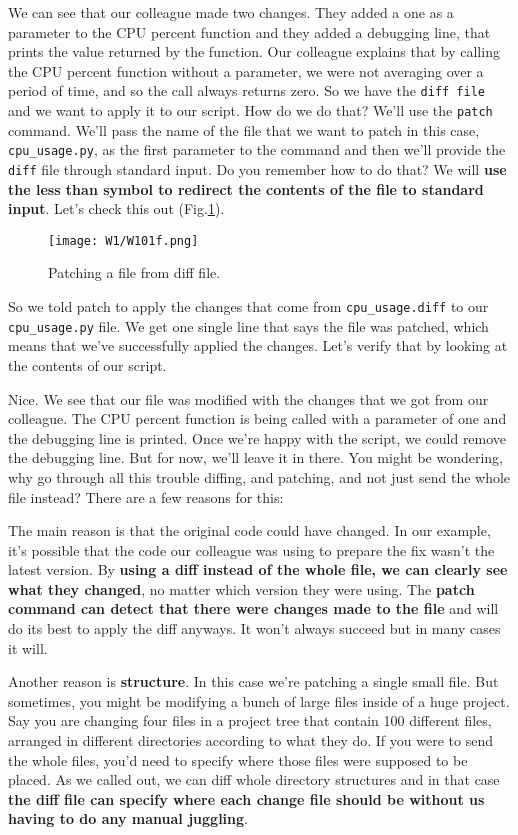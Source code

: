 	We can see that our colleague made two changes. They added a one as a parameter to the CPU percent function and they added a debugging line, that prints the value returned by the function. Our colleague explains that by calling the CPU percent function without a parameter, we were not averaging over a period of time, and so the call always returns zero. 
	So we have the \texttt{diff file} and we want to apply it to our script. How do we do that? We'll use the \texttt{patch} command. 
	We'll pass the name of the file that we want to patch in this case, \verb|cpu_usage.py|, as the first parameter to the command and then we'll provide the \texttt{diff} file through standard input. Do you remember how to do that? We will \textbf{use the less than symbol to redirect the contents of the file to standard input}. Let's check this out (Fig.\ref{W101f}).
	
	\begin{figure} 
		\caption{Patching a file from diff file.}
		\centering
		\texttt{[image: W1/W101f.png]}
		\label{W101f}
	\end{figure}

	So we told patch to apply the changes that come from \verb|cpu_usage.diff| to our \verb|cpu_usage.py| file. We get one single line that says the file was patched, which means that we've successfully applied the changes. Let's verify that by looking at the contents of our script.

	Nice. We see that our file was modified with the changes that we got from our colleague. The CPU percent function is being called with a parameter of one and the debugging line is printed. Once we're happy with the script, we could remove the debugging line. But for now, we'll leave it in there. You might be wondering, why go through all this trouble diffing, and patching, and not just send the whole file instead? 
	There are a few reasons for this: 
	
	The main reason is that the original code could have changed. In our example, it's possible that the code our colleague was using to prepare the fix wasn't the latest version. By \textbf{using a diff instead of the whole file, we can clearly see what they changed}, no matter which version they were using. The \textbf{patch command can detect that there were changes made to the file} and will do its best to apply the diff anyways. It won't always succeed but in many cases it will. 
	
	Another reason is \textbf{structure}. In this case we're patching a single small file. But sometimes, you might be modifying a bunch of large files inside of a huge project. Say you are changing four files in a project tree that contain 100 different files, arranged in different directories according to what they do. If you were to send the whole files, you'd need to specify where those files were supposed to be placed. As we called out, we can diff whole directory structures and in that case \textbf{the diff file can specify where each change file should be without us having to do any manual juggling}.
	
